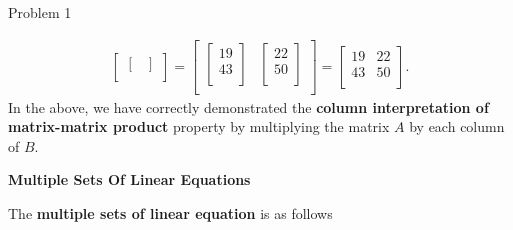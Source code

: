 \begin{problem}{Problem 1}
\begin{highlight}[Solution]
\begin{align*}
\begin{bmatrix}
\begin{bmatrix}
                \end{bmatrix} \\
            \end{bmatrix}
            = 
            \begin{bmatrix}
                \begin{bmatrix}
                    19 \\
                    43 \\
                \end{bmatrix} &
                \begin{bmatrix}
                    22 \\
                    50 \\
                \end{bmatrix} \\
            \end{bmatrix}
            = 
            \begin{bmatrix}
                19 & 22 \\
                43 & 50 \\
            \end{bmatrix}.
        \end{align*}
        In the above, we have correctly demonstrated the \textbf{column interpretation of matrix-matrix product} property by multiplying the matrix $A$ by each column of $B$. \vspace*{1em}

        \noindent \textbf{Multiple Sets Of Linear Equations} \vspace*{1em}

        The \textbf{multiple sets of linear equation} is as follows 


\end{highlight}
\end{problem}
